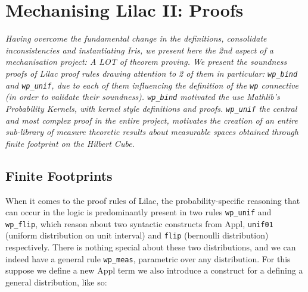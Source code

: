 \chapter{Mechanising Lilac II: Proofs}
\emph{Having overcome the fundamental change in the definitions, consolidate inconsistencies and instantiating Iris, we present here the 2nd aspect
of a mechanisation project: A LOT of theorem proving. We present the soundness proofs of Lilac proof rules drawing attention to 2 of them
in particular: \texttt{wp\_bind} and \texttt{wp\_unif}, due to each of them influencing the definition of the \texttt{wp}
connective (in order to validate their soundness). \texttt{wp\_bind} motivated the use Mathlib's Probability Kernels, with kernel style definitions
and proofs. \texttt{wp\_unif} the central and most complex proof in the entire project, motivates the creation of an entire sub-library of
measure theoretic results about measurable spaces obtained through finite footprint on the Hilbert Cube.}




\section{Finite Footprints}
\label{sec:ff}
When it comes to the proof rules of Lilac, the probability-specific reasoning that can occur in the logic is predominantly present in two rules \texttt{wp\_unif} and
\texttt{wp\_flip}, which reason about two syntactic constructs from Appl, \texttt{unif01} (uniform distribution on unit interval) and \texttt{flip}
(bernoulli distribution) respectively. There is nothing special about these two distributions, and we can indeed have a general rule \texttt{wp\_meas}, parametric
over any distribution. For this suppose we define a new Appl term  we also introduce a construct for a defining a general distribution, like so:

